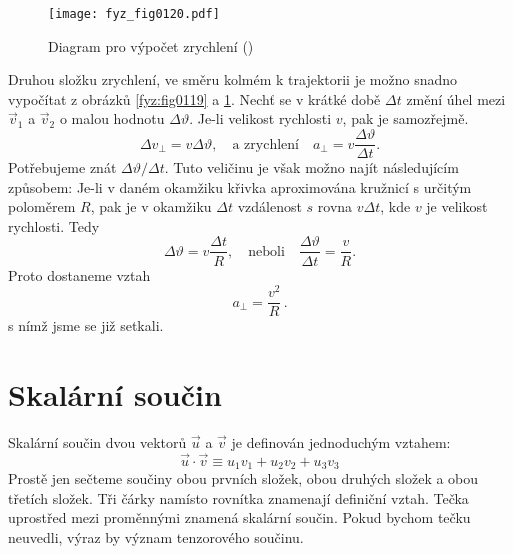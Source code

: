     \begin{figure}[ht!]  %
      \centering
      \texttt{[image: fyz\_fig0120.pdf]}
      \caption{Diagram pro výpočet zrychlení
              (\cite[s.~163]{Feynman01})}
      \label{fyz:fig0120}
    \end{figure}
    Druhou složku zrychlení, ve směru kolmém k trajektorii je možno snadno vypočítat z obrázků
    \ref{fyz:fig0119} a \ref{fyz:fig0120}. Nechť se v krátké době \(\Delta t\) změní úhel mezi 
    \(\vec{v}_1\) a \(\vec{v}_2\) o malou hodnotu \(\Delta\vartheta\). Je-li velikost rychlosti 
    \(v\), pak je samozřejmě.    
    \begin{equation*}
      \Delta v_\perp = v\Delta\vartheta, \quad\text{a zrychlení}\quad
      a_\perp = v\frac{\Delta\vartheta}{\Delta t}.
    \end{equation*}
    Potřebujeme znát \(\Delta\vartheta/\Delta t\). Tuto veličinu je však možno najít následujícím 
    způsobem: Je-li v daném okamžiku křivka aproximována kružnicí s určitým poloměrem \(R\), pak je 
    v okamžiku \(\Delta t\) vzdálenost \(s\) rovna \(v\Delta t\), kde \(v\) je velikost rychlosti. 
    Tedy
    \begin{equation*}
      \Delta\vartheta = v\frac{\Delta t}{R}, \quad\text{neboli}\quad
      \frac{\Delta\vartheta}{\Delta t} = \frac{v}{R}.
    \end{equation*}
    Proto dostaneme vztah
    \begin{equation}\label{fyz:eq159}
      \boxed{a_\perp = \frac{v^2}{R}}\,.
    \end{equation}
    s nímž jsme se již setkali.
    
  \section{Skalární součin}\label{fyz:IchapXIsecVI}
    Skalární součin dvou vektorů \(\vec{u}\) a \(\vec{v}\) je definován jednoduchým vztahem: 
    \begin{equation*}
      \vec{u}\cdot\vec{v} \equiv u_1v_1 + u_2v_2 + u_3v_3
    \end{equation*}
    Prostě jen sečteme součiny obou prvních složek, obou druhých složek a obou třetích složek. Tři
    čárky namísto rovnítka znamenají definiční vztah. Tečka uprostřed mezi proměnnými znamená
    skalární součin. Pokud bychom tečku neuvedli, výraz by význam tenzorového součinu.

